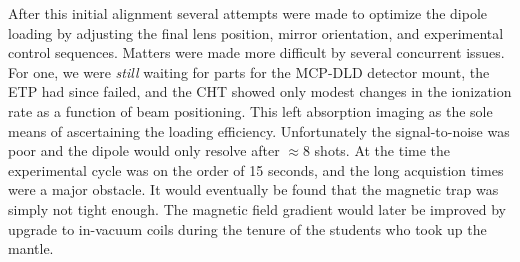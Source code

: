 	After this initial alignment several attempts were made to optimize the dipole loading by adjusting the final lens position, mirror orientation, and experimental control sequences.	
	Matters were made more difficult by several concurrent issues.
	For one, we were \emph{still} waiting for parts for the MCP-DLD detector mount, the ETP had since failed, and the CHT showed only modest changes in the ionization rate as a function of beam positioning.	
	This left absorption imaging as the sole means of ascertaining the loading efficiency.
	Unfortunately the signal-to-noise was poor and the dipole would only resolve after $\approx 8$ shots.
	At the time the experimental cycle was on the order of 15 seconds, and the long acquistion times were a major obstacle.
	It would eventually be found that the magnetic trap was simply not tight enough.
	The magnetic field gradient would later be improved by upgrade to in-vacuum coils during the tenure of the students who took up the mantle.
	





	
